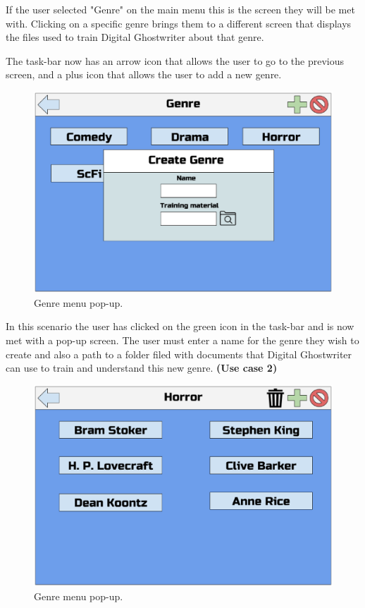 \documentclass[12pt]{article}
\begin{document}
If the user selected "Genre" on the main menu this is the screen they will be met with. Clicking on a specific genre brings them to a different screen that displays the files used to train Digital Ghostwriter about that genre. 

The task-bar now has an arrow icon that allows the user to go to the previous screen, and a plus icon that allows the user to add a new genre.

\newpage

\begin{figure}[ht]
  \centering
    \includegraphics[scale=0.5]{G3.eps}
    \caption{Genre menu pop-up.}
\end{figure}

In this scenario the user has clicked on the green icon in the task-bar and is now met with a pop-up screen. The user must enter a name for the genre they wish to create and also a path to a folder filed with documents that Digital Ghostwriter can use to train and understand this new genre. \newline \textbf{(Use case 2)}

\newpage

\begin{figure}[ht]
  \centering
    \includegraphics[scale=0.5]{G2.eps}
    \caption{Genre menu pop-up.}
\end{figure}
\end{document}
